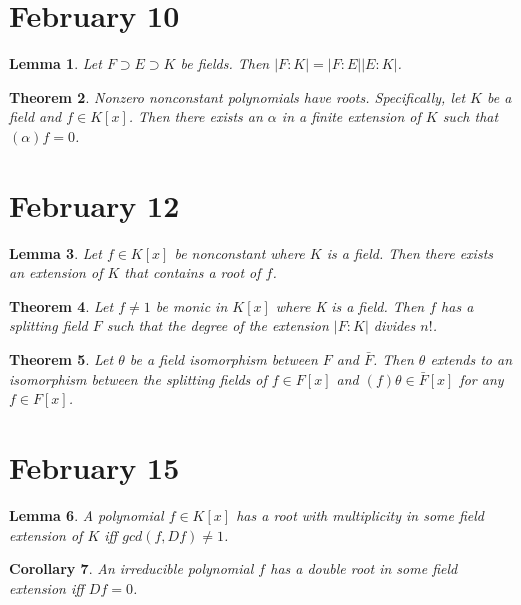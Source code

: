 \documentclass[letterpaper]{article}
\newtheorem{theorem}{Theorem}[section]
\newtheorem{lemma}[theorem]{Lemma}
\newtheorem{corollary}[theorem]{Corollary}
\begin{document}
\section{February 10}

\begin{lemma}
Let $F \supset E \supset K$ be fields. Then $|F \colon K| = |F \colon E||E \colon K|$.
\end{lemma}

\begin{theorem}
Nonzero nonconstant polynomials have roots. Specifically, let $K$ be a field and $f \in K[x]$. Then there exists an $\alpha$ in a finite extension of $K$ such that $(\alpha)f = 0$.
\end{theorem}

\section{February 12}

\begin{lemma}
Let $f \in K[x]$ be nonconstant where $K$ is a field.  Then there exists an extension of $K$ that contains a root of $f$.
\end{lemma}

\begin{theorem}
Let $f \neq 1$ be monic in $K[x]$ where K is a field.  Then $f$ has a splitting field $F$ such that the degree of the extension $|F \colon K|$  divides $n!$.
\end{theorem}

\begin{theorem}
Let $\theta$ be a field isomorphism between $F$ and $\bar{F}$. Then $\theta$ extends to an isomorphism between the splitting fields of $f \in F[x]$ and $(f) \theta \in \bar{F}[x]$ for any $f \in F[x]$.
\end{theorem}

\section{February 15}

\begin{lemma}
A polynomial $f \in K[x]$ has a root with multiplicity in some field extension of $K$ iff $gcd(f, Df) \ne 1$.
\end{lemma}

\begin{corollary}
An irreducible polynomial $f$ has a double root in some field extension iff $Df = 0$.
\end{corollary}
\end{document}
